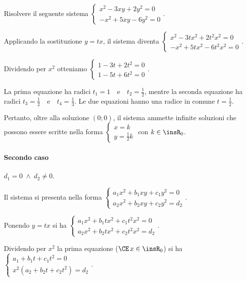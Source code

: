 \begin{exrig}
\begin{esempio}
Risolvere il seguente sistema $\left\{\begin{array}{l}x^2-3{xy}+2y^2=0 \\-x^2+5{xy}-6y^2=0 \end{array}\right.$.

Applicando la sostituzione $y={tx}$, il sistema diventa $\left\{\begin{array}{l}x^2-3{tx}^2+2t^2x^2=0 \\-x^2+5{tx}^2-6t^2x^2=0 \end{array}\right.$.

Dividendo per $x^2$ otteniamo $\left\{\begin{array}{l}1-3t+2t^2=0 \\1-5t+6t^2=0 \end{array}\right.$.

La prima equazione ha radici $t_1=1$~~e~~$t_2=\frac 1 2$, mentre la seconda equazione ha radici $t_3=\frac 1 2$~~e~~$t_4=\frac 1 3$. Le due equazioni hanno una radice in comune $t=\frac 1 2$.

Pertanto, oltre alla soluzione $(0;0)$, il sistema ammette infinite soluzioni che possono essere scritte nella forma $\left\{\begin{array}{l}x=k \\y=\frac 1 2k \end{array}\right.$ con $k\in\insR_0$.
\end{esempio}
\end{exrig}

\paragraph{Secondo caso}$d_1=0 \;\wedge\; d_2\neq 0$.

Il sistema si presenta nella forma $\left\{\begin{array}{l}{a_1x^2+b_1xy+c_1y^2=0}\\{a_2x^2+b_2xy+c_2y^2=d_2}\end{array}\right.$.

Ponendo $y=tx$ si ha $\left\{\begin{array}{l}{a_1x^2+b_1tx^2+c_1t^2x^2=0}\\{a_2x^2+b_2tx^2+c_2t^2x^2=d_2}\end{array}\right.$.

Dividendo per $x^2$ la prima equazione ($\CE\, x\in\insR_0$) si ha $\left\{\begin{array}{l}{a_1+{b_1t}+{c_1t}^2=0}\\{x^2(a_2+b_2t+c_2t^2)=d_2}\end{array}\right.$.

